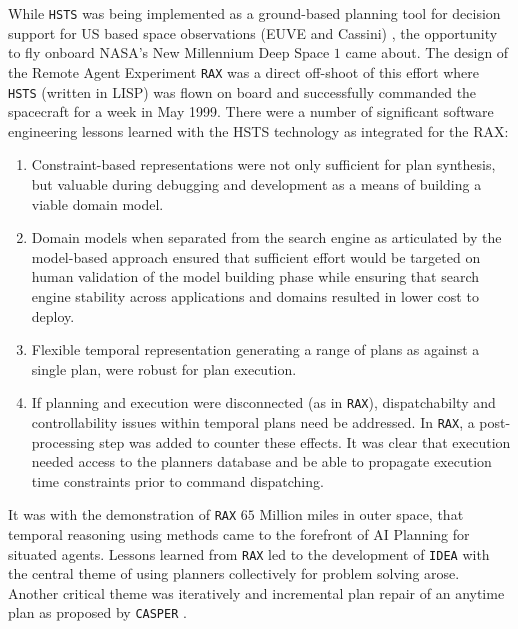 While \texttt{HSTS} \cite{mus94} was being implemented as a
ground-based planning tool for decision support for US based space
observations (EUVE and Cassini) \cite{mus95}, the opportunity to fly
onboard NASA’s New Millennium Deep Space $1$ came about. The design of
the Remote Agent Experiment \texttt{RAX} \cite{pell97, bernard98,
  pell98, mus98, DS1report, rajan00, jonsson00} was a direct off-shoot
of this effort where \texttt{HSTS} (written in LISP) was flown on
board and successfully commanded the spacecraft for a week in May
1999. There were a number of significant software engineering lessons
learned with the HSTS technology as integrated for the RAX:

\begin{enumerate}

\item Constraint-based representations were not only sufficient for
  plan synthesis, but valuable during debugging and development as a
  means of building a viable domain model.

\item Domain models when separated from the search engine as
  articulated by the model-based approach \cite{williams96a} ensured
  that sufficient effort would be targeted on human validation of the
  model building phase while ensuring that search engine stability
  across applications and domains resulted in lower cost to deploy.

\item Flexible temporal representation generating a range of plans as
  against a single plan, were robust for plan execution.

\item If planning and execution were disconnected (as in
  \texttt{RAX}), dispatchabilty \cite{mus98a} and controllability
  \cite{morris00} issues within temporal plans need be addressed. In
  \texttt{RAX}, a post-processing step was added to counter these
  effects. It was clear that execution needed access to the planners
  database and be able to propagate execution time constraints prior
  to command dispatching.

\end{enumerate}

It was with the demonstration of \texttt{RAX} $65$ Million miles in
outer space, that temporal reasoning using  methods
came to the forefront of AI Planning for situated agents. Lessons
learned from \texttt{RAX} led to the development of \texttt{IDEA}
\cite{mus02,mus04,Dias:2003ua,mus06} with the central theme of using
planners collectively for problem solving arose. Another critical
theme was iteratively and incremental plan repair of an anytime plan
\cite{Zaimag96} as proposed by \texttt{CASPER} \cite{chien00}.

